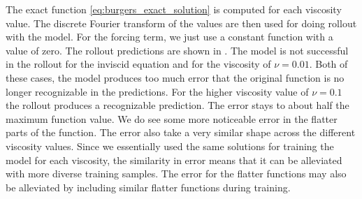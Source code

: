 \documentclass[preprint,12pt,times,authoryear]{elsarticle}
\begin{document}
The exact function \cref{eq:burgers_exact_solution} is computed for each viscosity value. The discrete Fourier transform of the values are then used for doing rollout with the model. For the forcing term, we just use a constant function with a value of zero. The rollout predictions are shown in . The model is not successful in the rollout for the inviscid equation and for the viscosity of \(\nu=0.01\). Both of these cases, the model produces too much error that the original function is no longer recognizable in the predictions. For the higher viscosity value of \(\nu=0.1\) the rollout produces a recognizable prediction. The error stays to about half the maximum function value. We do see some more noticeable error in the flatter parts of the function. The error also take a very similar shape across the different viscosity values. Since we essentially used the same solutions for training the model for each viscosity, the similarity in error means that it can be alleviated with more diverse training samples. The error for the flatter functions may also be alleviated by including similar flatter functions during training.
\end{document}
